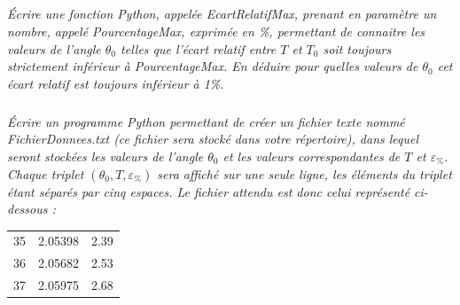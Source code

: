 \documentclass[10pt,oneside]{article}
\begin{document}
\subparagraph{}
\textit{Écrire une fonction Python, appelée EcartRelatifMax, prenant en paramètre un nombre, appelé
PourcentageMax, exprimée en \%, permettant de connaitre les valeurs de l’angle $\theta_0$ telles que l’écart relatif entre $T$ et $T_0$ soit toujours strictement inférieur à PourcentageMax. En déduire pour quelles valeurs de $\theta_0$ cet écart relatif est toujours inférieur à 1\%.}

\subparagraph{\label{q9}}
\textit{Écrire un programme Python permettant de créer un fichier texte nommé FichierDonnees.txt (ce fichier sera stocké dans votre répertoire), dans lequel seront stockées les valeurs de l’angle $\theta_0$  et les valeurs correspondantes de $T$ et $\varepsilon_{\%}$. Chaque triplet $(\theta_0,T,\varepsilon_{\%})$ sera affiché sur une seule ligne, les
éléments du triplet étant séparés par cinq espaces. Le fichier attendu est donc celui représenté ci-dessous
:}

\begin{tabular}{lll}
35& 2.05398 &2.39\\
36 &2.05682 &2.53\\
37 &2.05975 &2.68
\end{tabular}
\end{document}
